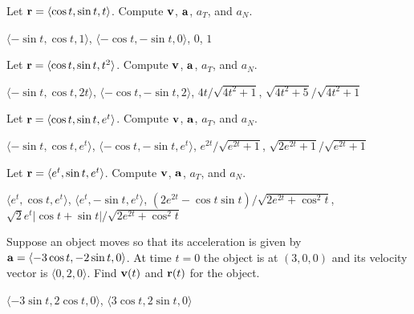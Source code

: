 \begin{exercises}

\begin{exercise} Let ${\bf r}=\langle \cos t,\sin t,t\rangle$. 
Compute ${\bf v}$, ${\bf a}$,
$a_T$, and $a_N$.
\begin{answer} $\langle -\sin t,\cos t,1\rangle$,
$\langle -\cos t, -\sin t,0\rangle$,
$0$, $1$
\end{answer}\end{exercise}

\begin{exercise} Let ${\bf r}=\langle \cos t,\sin t,t^2\rangle$. 
Compute ${\bf v}$, ${\bf a}$,
$a_T$, and $a_N$.
\begin{answer} $\langle -\sin t,\cos t,2t\rangle$,
$\langle -\cos t, -\sin t,2\rangle$,
$4t/\sqrt{4t^2+1}$, $\sqrt{4t^2+5}/\sqrt{4t^2+1}$
\end{answer}\end{exercise}

\begin{exercise} Let ${\bf r}=\langle \cos t,\sin t,e^t\rangle$. 
Compute ${\bf v}$, ${\bf a}$,
$a_T$, and $a_N$.
\begin{answer} $\langle -\sin t,\cos t,e^t\rangle$,
$\langle -\cos t, -\sin t,e^t\rangle$,
$e^{2t}/\sqrt{e^{2t}+1}$, $\sqrt{2e^{2t}+1}/\sqrt{e^{2t}+1}$
\end{answer}\end{exercise}

\begin{exercise} Let ${\bf r}=\langle e^t,\sin t,e^t\rangle$. 
Compute ${\bf v}$, ${\bf a}$,
$a_T$, and $a_N$.
\begin{answer} $\langle e^t,\cos t,e^t\rangle$,
$\langle e^t, -\sin t,e^t\rangle$,
$(2e^{2t}-\cos t\sin t)/\sqrt{2e^{2t}+\cos^2 t}$, 
$\sqrt{2}e^t|\cos t+\sin t|/\sqrt{2e^{2t}+\cos^2 t}$
\end{answer}\end{exercise}

\begin{exercise} Suppose an object moves so that its acceleration is given by
${\bf a}=\langle -3\cos t,-2\sin t,0\rangle$. At time $t=0$ the object
is at $(3,0,0)$ and its velocity vector is $\langle
0,2,0\rangle$. Find ${\bf v}(t)$ and ${\bf r}(t)$ for the object.
\begin{answer} $\langle -3\sin t,2\cos t,0\rangle$,
$\langle 3\cos t, 2\sin t,0\rangle$
\end{answer}\end{exercise}


\end{exercises}
